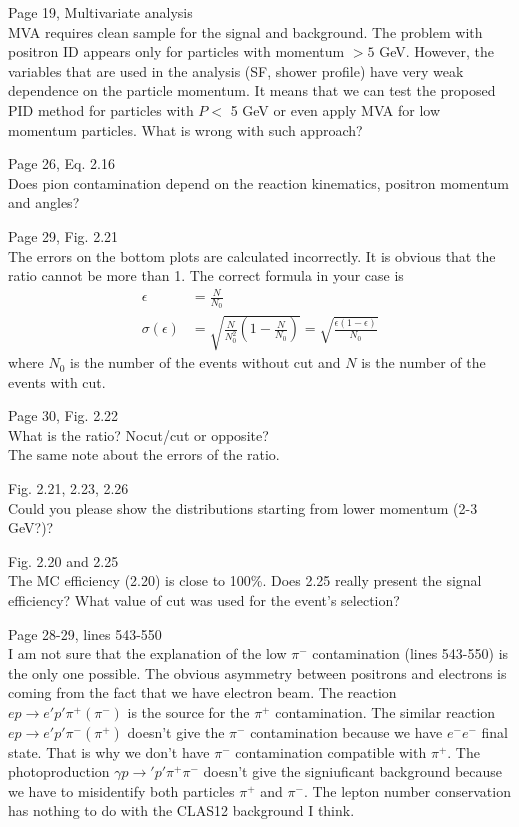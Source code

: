 \documentclass[11pt]{article}
\begin{document}
Page 19, Multivariate analysis\\
MVA requires clean sample for the signal and background. The problem with positron ID appears only for particles with momentum $> 5$ GeV. However, the variables that are used in the analysis (SF, shower profile) have very weak dependence on the particle momentum. It means that we can test the proposed PID method for particles with $P<$ 5 GeV or even apply MVA for low momentum particles. What is wrong with such approach?

Page 26, Eq. 2.16\\
Does pion contamination depend on the reaction kinematics, positron momentum and angles?

Page 29, Fig. 2.21\\
The errors on the bottom plots are calculated incorrectly. It is obvious that the ratio cannot be more than 1.
The correct formula in your case is
\begin{equation}
\begin{split}
        \epsilon&=\frac{N}{N_0}\\
	\sigma(\epsilon)&=\sqrt{\frac{N}{N_0^2}(1-\frac{N}{N_0})}=\sqrt{\frac{\epsilon(1-\epsilon)}{N_0}}
\end{split}
\end{equation}
\noindent
where $N_0$ is the number of the events without cut and $N$ is the number of the events with cut.

Page 30, Fig. 2.22\\
What is the ratio? Nocut/cut or opposite?\\
The same note about the errors of the ratio.

Fig. 2.21, 2.23, 2.26\\
Could you please show the distributions starting from lower momentum (2-3 GeV?)?

Fig. 2.20 and 2.25\\
The MC efficiency (2.20) is close to 100\%. 
Does 2.25 really present the signal efficiency? 
What value of cut was used for the event's selection? 

Page 28-29, lines 543-550\\
I am not sure that the explanation of the low $\pi^-$ contamination (lines 543-550) is the only one possible.
The obvious asymmetry between positrons and electrons is coming from the fact that we have electron beam.
The reaction $ep\to e'p'\pi^+(\pi^-)$ is the source for the $\pi^+$ contamination.
The similar reaction  $ep\to e'p'\pi^-(\pi^+)$ doesn't give the $\pi^-$ contamination because we have $e^-e^-$ final state. 
That is why we don't have $\pi^-$ contamination compatible with $\pi^+$.  The photoproduction
$\gamma p\to'p'\pi^+\pi^-$ doesn't give the signiuficant background because we have to misidentify both particles $\pi^+$  and $\pi^-$. The lepton number conservation has nothing to do with the CLAS12 background I think.
\end{document}
